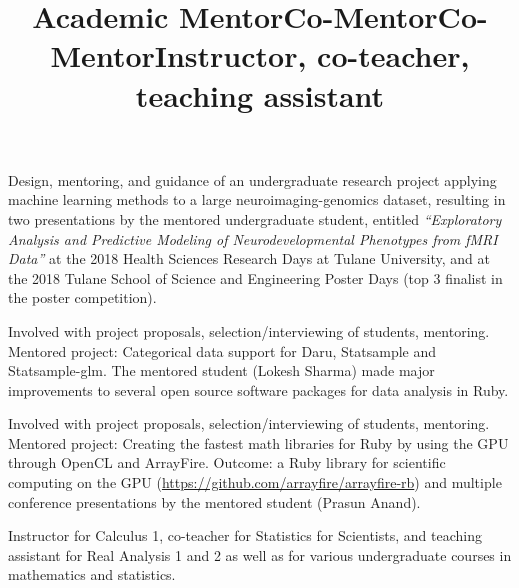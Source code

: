 \documentclass[overlapped, line, 10pt]{res} %
\begin{document}
\begin{resume}
\title{Academic Mentor}
\begin{position}
  Design, mentoring, and guidance of an undergraduate research project applying machine learning methods to a large neuroimaging-genomics dataset, resulting in two presentations by the mentored undergraduate student, entitled \emph{``Exploratory Analysis and Predictive Modeling of Neurodevelopmental Phenotypes from fMRI Data''} at the 2018 Health Sciences Research Days at Tulane University, and at the 2018 Tulane School of Science and Engineering Poster Days (top 3 finalist in the poster competition).
\end{position}

\title{Co-Mentor}
\begin{position}
  Involved with project proposals, selection/interviewing of students, mentoring. Mentored project: Categorical data support for Daru, Statsample and Statsample-glm. The mentored student (Lokesh Sharma) made major improvements to several open source software packages for data analysis in Ruby.
\end{position}

\title{Co-Mentor}
\begin{position}
  Involved with project proposals, selection/interviewing of students, mentoring. Mentored project: Creating the fastest math libraries for Ruby by using the GPU through OpenCL and ArrayFire. Outcome: a Ruby library for scientific computing on the GPU (\url{https://github.com/arrayfire/arrayfire-rb}) and multiple conference presentations by the mentored student (Prasun Anand).
\end{position}

\title{Instructor, co-teacher, teaching assistant}
\begin{position}
  Instructor for Calculus 1, co-teacher for Statistics for Scientists, and teaching assistant for Real Analysis 1 and 2 as well as for various undergraduate courses in mathematics and statistics.
\end{position}


\end{resume}
\end{document}
